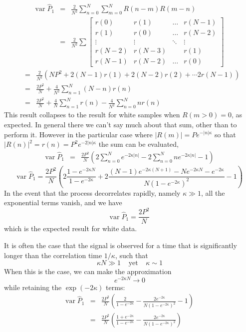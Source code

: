 \begin{eqnarray}
\textrm{var}\;\hat{P}_1 &=&  \frac{2}{N^2}\sum_{n=0}^N \sum_{m=0}^N  
R(n-m) R(m-n) \\
&=& \frac{2}{N^2} \sum \left[ \begin{array}{cccc}
r(0) & r(1) & \ldots & r(N-1)  \\
r(1) & r(0) & \ldots & r(N-2) \\
\vdots & \vdots & \ddots & \vdots \\
r(N-2) & r(N-3) &  & r(1) \\
r(N-1) & r(N-2) & \ldots & r(0) 
\end{array} \right]
\end{eqnarray}
\begin{eqnarray}
  &=& \frac{2}{N^2} \left(NP^2 + 2(N-1)r(1) + 2(N-2)r(2) + \cdots 2r(N-1)\right)\\
  &=& \frac{2P^2}{N} + \frac{4}{N^2}  \sum_{n = 1}^N (N-n)r(n) \\
  &=& \frac{2P^2}{N} + \frac{4}{N}  \sum_{n = 1}^N r(n) - \frac{4}{N^2}  \sum_{n = 0}^N n r(n)
\end{eqnarray}
This result collapses to the result for white samples when $R(m > 0) =
0$, as expected.  In general there we can't say much about that sum, other than to perform it.
However in the particular case where $|R(m)| = Pe^{-|n|\kappa}$ so that $|R(n)|^2 = r(n) = P^2
e^{-2|n|\kappa}$ the sum can be evaluated,
\begin{eqnarray}
\textrm{var}\;\hat{P}_1 &=& 
\frac{2P^2}{N}\left(2\sum_{n=0}^N e^{-2\kappa |n|} - 2\sum_{n=0}^N ne^{-2\kappa |n|} - 1\right)
\end{eqnarray}
\begin{equation}
\textrm{var}\;\hat{P}_1 = \frac{2P^2}{N} \left(2\frac{1 - e^{-2\kappa N}}{1 - e^{-2\kappa}} + 
2\frac{(N-1) e^{-2\kappa(N+1)} - Ne^{-2\kappa N} - e^{-2\kappa}}{N(1 - e^{-2\kappa})^2} - 1\right) 
\end{equation}
In the event that the process decorrelates rapidly, namely $\kappa \gg 1$, all the exponential terms vanish, and we have
\begin{equation}
\textrm{var}\;\hat{P}_1 = \frac{2P^2}{N} 
\end{equation}
which is the expected result for white data.

It is often the case that the signal is observed for a time that is significantly longer than the correlation 
time $1/\kappa$, such that 
\begin{equation}
\kappa N \gg 1 \;\;\;\; \textrm{yet} \;\;\;\; \kappa \sim 1
\end{equation}  
When this is the case, we can make the approximation
\begin{equation}
e^{-2\kappa N} \rightarrow 0
\end{equation}
while retaining the $\exp(-2\kappa)$ terms:
\begin{eqnarray}
\textrm{var}\;\hat{P}_1 &=& \frac{2P^2}{N} \left(\frac{2}{1 - e^{-2\kappa}} - \frac{  2e^{-2\kappa}}{N(1 - e^{-2\kappa})^2} - 1\right) \\
&=& \frac{2P^2}{N} \left(\frac{1 + e^{-2\kappa}}{1 - e^{-2\kappa}} - \frac{  2e^{-2\kappa}}{N(1 - e^{-2\kappa})^2}\right)
\end{eqnarray}

